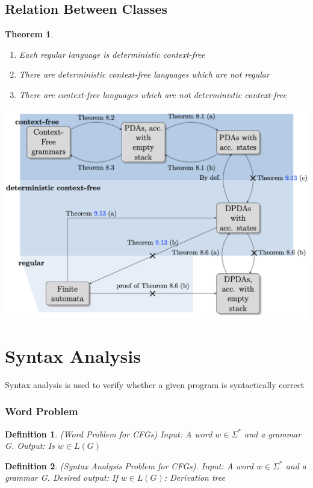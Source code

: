 \documentclass[a3paper, 8pt]{extarticle}
\newtheorem{theorem}{Theorem}[section]
\newtheorem*{definition}{Definition}
\begin{document}
\begin{multicols*}{6}
\subsection{Relation Between Classes}
\begin{theorem}
\begin{enumerate}
    \item Each regular language is deterministic context-free
    \item There are deterministic context-free languages which are not regular
    \item There are context-free languages which are not deterministic context-free 
\end{enumerate}
\end{theorem}
\includegraphics[width=\columnwidth]{images/Screen Shot 2022-11-11 at 14.26.35.png}

\section{Syntax Analysis}
Syntax analysis is used to verify whether a given program is syntactically correct
\subsubsection{Word Problem}

 

\begin{definition}
    (Word Problem for CFGs)
    Input: A word $w \in \Sigma^*$ and a grammar G.
    Output: Is $w \in L(G)$
\end{definition}

\begin{definition}
     (Syntax Analysis Problem for CFGs).
     Input: A word $w \in \Sigma^*$ and a grammar G.
     Desired output: If $w \in L(G)$: Derivation tree
\end{definition}


\end{multicols*}
\end{document}
